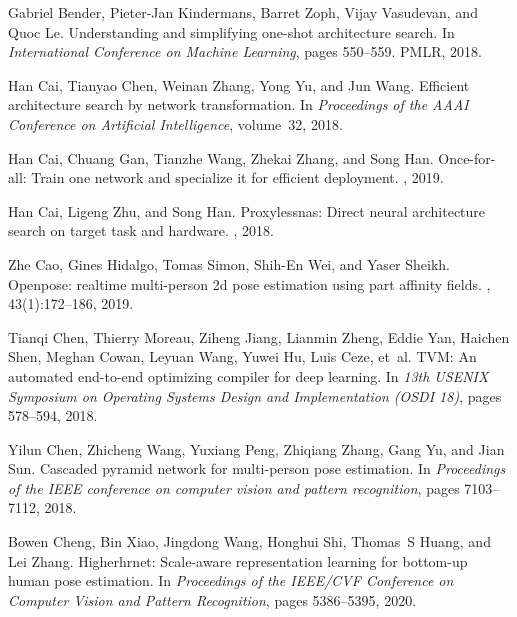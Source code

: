 \documentclass[10pt,twocolumn,letterpaper]{article}
\begin{document}
{\small
\begin{thebibliography}{10}\itemsep=-1pt

Gabriel Bender, Pieter-Jan Kindermans, Barret Zoph, Vijay Vasudevan, and Quoc
  Le.
\newblock Understanding and simplifying one-shot architecture search.
\newblock In {\em International Conference on Machine Learning}, pages
  550--559. PMLR, 2018.

Han Cai, Tianyao Chen, Weinan Zhang, Yong Yu, and Jun Wang.
\newblock Efficient architecture search by network transformation.
\newblock In {\em Proceedings of the AAAI Conference on Artificial
  Intelligence}, volume~32, 2018.

Han Cai, Chuang Gan, Tianzhe Wang, Zhekai Zhang, and Song Han.
\newblock Once-for-all: Train one network and specialize it for efficient
  deployment.
, 2019.

Han Cai, Ligeng Zhu, and Song Han.
\newblock Proxylessnas: Direct neural architecture search on target task and
  hardware.
, 2018.

Zhe Cao, Gines Hidalgo, Tomas Simon, Shih-En Wei, and Yaser Sheikh.
\newblock Openpose: realtime multi-person 2d pose estimation using part
  affinity fields.
,
  43(1):172--186, 2019.

Tianqi Chen, Thierry Moreau, Ziheng Jiang, Lianmin Zheng, Eddie Yan, Haichen
  Shen, Meghan Cowan, Leyuan Wang, Yuwei Hu, Luis Ceze, et~al.
\newblock TVM: An automated end-to-end optimizing compiler for deep
  learning.
\newblock In {\em 13th USENIX Symposium on Operating Systems Design and
  Implementation (OSDI 18)}, pages 578--594, 2018.

Yilun Chen, Zhicheng Wang, Yuxiang Peng, Zhiqiang Zhang, Gang Yu, and Jian Sun.
\newblock Cascaded pyramid network for multi-person pose estimation.
\newblock In {\em Proceedings of the IEEE conference on computer vision and
  pattern recognition}, pages 7103--7112, 2018.

Bowen Cheng, Bin Xiao, Jingdong Wang, Honghui Shi, Thomas~S Huang, and Lei
  Zhang.
\newblock Higherhrnet: Scale-aware representation learning for bottom-up human
  pose estimation.
\newblock In {\em Proceedings of the IEEE/CVF Conference on Computer Vision and
  Pattern Recognition}, pages 5386--5395, 2020.


\end{thebibliography}}
\end{document}

